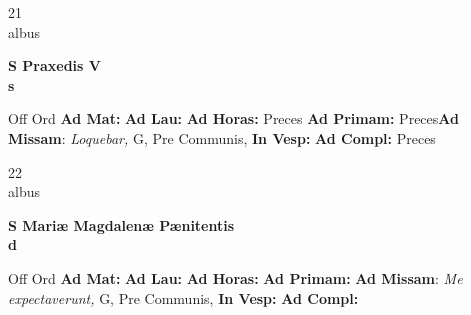 \documentclass[10pt, openany]{book}
\begin{document}
    \begin{center}
        \begin{minipage}{3.5in}
            \vspace{2em}
            \begin{minipage}{0.5in}
                {\Huge 21} \\
                {\normalsize albus}
            \end{minipage}
            \begin{minipage}{3.0in}
                \textbf{ \large S Praxedis V \\
                \textnormal{\normalsize s}}

            \end{minipage}
            \begin{justify}Off Ord
                \textbf{Ad Mat: }
                \textbf{Ad Lau: }
                \textbf{Ad Horas: }Preces
                \textbf{Ad Primam: }Preces\textbf{Ad Missam}: \textit{Loquebar,} G, Pre Communis, 
                \textbf{In Vesp: }
                \textbf{Ad Compl: }Preces
            \end{justify}
        \end{minipage}
    \end{center}

    \begin{center}
        \begin{minipage}{3.5in}
            \vspace{2em}
            \begin{minipage}{0.5in}
                {\Huge 22} \\
                {\normalsize albus}
            \end{minipage}
            \begin{minipage}{3.0in}
                \textbf{ \large S Mariæ Magdalenæ Pænitentis \\
                \textnormal{\normalsize d}}

            \end{minipage}
            \begin{justify}Off Ord
                \textbf{Ad Mat: }
                \textbf{Ad Lau: }
                \textbf{Ad Horas: }
                \textbf{Ad Primam: }\textbf{Ad Missam}: \textit{Me expectaverunt,} G, Pre Communis, 
                \textbf{In Vesp: }
                \textbf{Ad Compl: }
            \end{justify}
        \end{minipage}
    \end{center}
\end{document}
